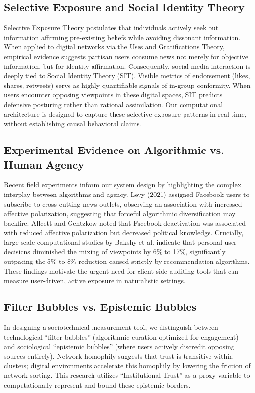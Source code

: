 \documentclass[10pt, conference, compsoc]{IEEEtran}
\begin{document}
\subsection{Selective Exposure and Social Identity Theory}
Selective Exposure Theory postulates that individuals actively seek out information affirming pre-existing beliefs while avoiding dissonant information. When applied to digital networks via the Uses and Gratifications Theory, empirical evidence suggests partisan users consume news not merely for objective information, but for identity affirmation. Consequently, social media interaction is deeply tied to Social Identity Theory (SIT). Visible metrics of endorsement (likes, shares, retweets) serve as highly quantifiable signals of in-group conformity. When users encounter opposing viewpoints in these digital spaces, SIT predicts defensive posturing rather than rational assimilation. Our computational architecture is designed to capture these selective exposure patterns in real-time, without establishing causal behavioral claims.

\subsection{Experimental Evidence on Algorithmic vs. Human Agency}
Recent field experiments inform our system design by highlighting the complex interplay between algorithms and agency. Levy (2021) assigned Facebook users to subscribe to cross-cutting news outlets, observing an association with increased affective polarization, suggesting that forceful algorithmic diversification may backfire. Allcott and Gentzkow noted that Facebook deactivation was associated with reduced affective polarization but decreased political knowledge. Crucially, large-scale computational studies by Bakshy et al. indicate that personal user decisions diminished the mixing of viewpoints by 6\% to 17\%, significantly outpacing the 5\% to 8\% reduction caused strictly by recommendation algorithms. These findings motivate the urgent need for client-side auditing tools that can measure user-driven, active exposure in naturalistic settings.

\subsection{Filter Bubbles vs. Epistemic Bubbles}
In designing a sociotechnical measurement tool, we distinguish between technological ``filter bubbles'' (algorithmic curation optimized for engagement) and sociological ``epistemic bubbles'' (where users actively discredit opposing sources entirely). Network homophily suggests that trust is transitive within clusters; digital environments accelerate this homophily by lowering the friction of network sorting. This research utilizes ``Institutional Trust'' as a proxy variable to computationally represent and bound these epistemic borders.
\end{document}
